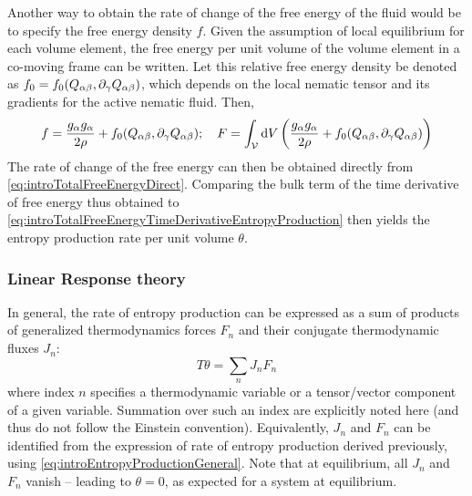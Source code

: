 Another way to obtain the rate of change of the free energy of the fluid would be to specify the free energy density $f$. Given the assumption of local equilibrium for each volume element, the free energy per unit volume of the volume element in a co-moving frame can be written. Let this relative free energy density be denoted as $f_0 = f_0(Q_{\alpha\beta},\inlinePartial{\gamma}{Q_{\alpha\beta}})$, which depends on the local nematic tensor and its gradients for the 
active nematic fluid. Then,
\begin{equation}\label{eq:introTotalFreeEnergyDirect}
    f = \frac{g_\alpha g_\alpha}{2\rho} + f_0(Q_{\alpha\beta},\inlinePartial{\gamma}{Q_{\alpha\beta}}); \quad F = \int_{\mathcal{V}} \dd{V} \left(\frac{g_\alpha g_\alpha}{2\rho} + f_0(Q_{\alpha\beta},\inlinePartial{\gamma}{Q_{\alpha\beta}})\right)
\end{equation}
The rate of change of the free energy can then be obtained directly from \autoref{eq:introTotalFreeEnergyDirect}. Comparing the bulk term of the time derivative of free energy thus obtained to \autoref{eq:introTotalFreeEnergyTimeDerivativeEntropyProduction} then yields the entropy production rate per unit volume $\theta$.

\subsubsection{Linear Response theory}\label{subsubsec:introLinearResponse}
In general, the rate of entropy production can be expressed as a sum of products of generalized thermodynamics forces $F_n$ and their conjugate thermodynamic fluxes $J_n$:
\begin{equation}\label{eq:introEntropyProductionGeneral}
    T\theta = \sum_n J_nF_n
\end{equation}
where index $n$ specifies a thermodynamic variable or a tensor/vector component of a given variable. Summation over such an index are explicitly noted here (and thus do not follow the Einstein convention). Equivalently, $J_n$ and $F_n$ can be identified from the expression of rate of entropy production derived previously, using \autoref{eq:introEntropyProductionGeneral}. Note that at equilibrium, all $J_n$ and $F_n$ vanish -- leading to $\theta = 0$, as expected for a system at equilibrium.

